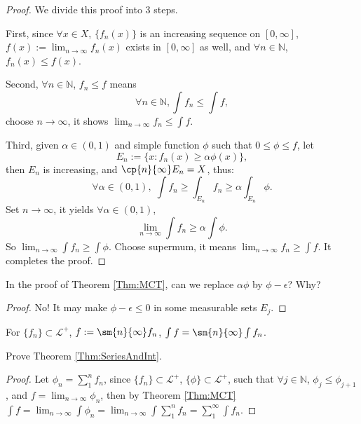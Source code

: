 \begin{proof}
    We divide this proof into 3 steps. 

    First, since $\forall x\in X$, $\{f_{n}(x)\}$ is an increasing 
    sequence on $[0,\infty]$, $f(x):=\lim_{n\rightarrow\infty}f_{n}(x)$ 
    exists in $[0,\infty]$ as well, and $\forall n\in\mathbb{N}$, 
    $f_{n}(x)\le f(x)$.

    Second, $\forall n\in\mathbb{N}$, $f_{n}\le f$ means 
    \begin{displaymath}
        \forall n\in\mathbb{N}, \int f_{n}\le\int f,
    \end{displaymath}
    choose $n\rightarrow\infty$, 
    it shows $\lim_{n\rightarrow\infty}f_{n}\le\int f$.

    Third, given $\alpha\in(0,1)$ and simple function $\phi$ 
    such that $0\le\phi\le f$, let 
    \begin{displaymath}
        E_n:=\{x:f_{n}(x)\ge\alpha\phi(x)\},
    \end{displaymath}
    then $E_{n}$ is increasing, and $\cp{n}{\infty}E_n=X$, thus:
    \begin{displaymath}
        \forall\alpha\in(0,1),\;
        \int f_n\ge\int_{E_n}f_{n}\ge\alpha\int_{E_n}\phi.
    \end{displaymath}
    Set $n\rightarrow\infty$, it yields $\forall\alpha\in(0,1)$, 
    \begin{displaymath}
        \lim_{n\rightarrow\infty}\int f_n\ge\alpha\int\phi.
    \end{displaymath}
    So $\lim_{n\rightarrow\infty}\int f_n\ge\int\phi$. 
    Choose supermum, it means 
    $\lim_{n\rightarrow\infty}f_n\ge\int f$. 
    It completes the proof.
\end{proof}
\begin{exc}
    In the proof of Theorem \ref{Thm:MCT}, 
    can we replace $\alpha\phi$ by $\phi-\epsilon$? 
    Why?
\end{exc}
\begin{proof}
    No! It may make $\phi-\epsilon\leq0$ in some measurable
    sets $E_j$.
\end{proof}
\begin{thm}
    \label{Thm:SeriesAndInt}
    For $\{f_n\}\subset \mathcal{L}^{+}$, 
    $f:=\sm{n}{\infty}f_n$, 
    $\int f=\sm{n}{\infty}\int f_n$.
\end{thm}
\begin{exc}
    Prove Theorem \ref{Thm:SeriesAndInt}.
\end{exc}
\begin{proof}
    Let $\phi_n=\sum_{1}^{n}f_n$, since 
    $\{f_n\}\subset\mathcal{L}^{+}$, 
    $\{\phi\}\subset\mathcal{L}^{+}$, such that 
    $\forall j\in\mathbb{N}$, $\phi_j\leq\phi_{j+1}$, and
    $f=\lim_{n\rightarrow\infty}\phi_n$,
    then by Theorem \ref{Thm:MCT} $\int f=\lim_{n\rightarrow\infty}\int\phi_n
    =\lim_{n\rightarrow\infty}\int\sum_{1}^{n}f_n
    =\sum_{1}^{\infty}\int f_n$.
\end{proof}
